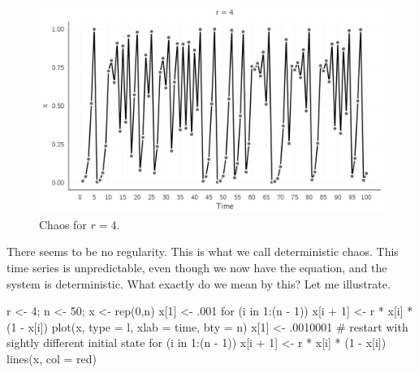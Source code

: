 \documentclass[
  a4paper,
  DIV=11,
  numbers=noendperiod]{scrreprt}
\newenvironment{Shaded}{\begin{snugshade}}{\end{snugshade}}
\newcommand{\AttributeTok}[1]{\textcolor[rgb]{0.40,0.45,0.13}{#1}}
\newcommand{\CommentTok}[1]{\textcolor[rgb]{0.37,0.37,0.37}{#1}}
\newcommand{\ControlFlowTok}[1]{\textcolor[rgb]{0.00,0.23,0.31}{#1}}
\newcommand{\DecValTok}[1]{\textcolor[rgb]{0.68,0.00,0.00}{#1}}
\newcommand{\FunctionTok}[1]{\textcolor[rgb]{0.28,0.35,0.67}{#1}}
\newcommand{\NormalTok}[1]{\textcolor[rgb]{0.00,0.23,0.31}{#1}}
\newcommand{\OtherTok}[1]{\textcolor[rgb]{0.00,0.23,0.31}{#1}}
\newcommand{\SpecialCharTok}[1]{\textcolor[rgb]{0.37,0.37,0.37}{#1}}
\newcommand{\StringTok}[1]{\textcolor[rgb]{0.13,0.47,0.30}{#1}}
\begin{document}
\begin{figure}

{\centering \includegraphics{media/ch2/fig-ch2-img5.jpg}

}

\caption{\label{fig-ch2-img5}Chaos for \(r = 4\).}

\end{figure}

There seems to be no regularity. This is what we call deterministic
chaos. This time series is unpredictable, even though we now have the
equation, and the system is deterministic. What exactly do we mean by
this? Let me illustrate.

\begin{Shaded}
\begin{Highlighting}[]
\NormalTok{r }\OtherTok{\textless{}{-}} \DecValTok{4}\NormalTok{;  n }\OtherTok{\textless{}{-}} \DecValTok{50}\NormalTok{; x }\OtherTok{\textless{}{-}} \FunctionTok{rep}\NormalTok{(}\DecValTok{0}\NormalTok{,n)}
\NormalTok{x[}\DecValTok{1}\NormalTok{] }\OtherTok{\textless{}{-}}\NormalTok{ .}\DecValTok{001}
\ControlFlowTok{for}\NormalTok{ (i }\ControlFlowTok{in} \DecValTok{1}\SpecialCharTok{:}\NormalTok{(n }\SpecialCharTok{{-}} \DecValTok{1}\NormalTok{))}
\NormalTok{  x[i }\SpecialCharTok{+} \DecValTok{1}\NormalTok{] }\OtherTok{\textless{}{-}}\NormalTok{ r }\SpecialCharTok{*}\NormalTok{ x[i] }\SpecialCharTok{*}\NormalTok{ (}\DecValTok{1} \SpecialCharTok{{-}}\NormalTok{ x[i])}
\FunctionTok{plot}\NormalTok{(x, }\AttributeTok{type =} \StringTok{\textquotesingle{}l\textquotesingle{}}\NormalTok{, }\AttributeTok{xlab =} \StringTok{\textquotesingle{}time\textquotesingle{}}\NormalTok{, }\AttributeTok{bty =} \StringTok{\textquotesingle{}n\textquotesingle{}}\NormalTok{)}
\NormalTok{x[}\DecValTok{1}\NormalTok{] }\OtherTok{\textless{}{-}}\NormalTok{ .}\DecValTok{0010001}
\CommentTok{\# restart with sightly different initial state}
\ControlFlowTok{for}\NormalTok{ (i }\ControlFlowTok{in} \DecValTok{1}\SpecialCharTok{:}\NormalTok{(n }\SpecialCharTok{{-}} \DecValTok{1}\NormalTok{))}
\NormalTok{  x[i }\SpecialCharTok{+} \DecValTok{1}\NormalTok{] }\OtherTok{\textless{}{-}}\NormalTok{ r }\SpecialCharTok{*}\NormalTok{ x[i] }\SpecialCharTok{*}\NormalTok{ (}\DecValTok{1} \SpecialCharTok{{-}}\NormalTok{ x[i])}
\FunctionTok{lines}\NormalTok{(x, }\AttributeTok{col =} \StringTok{\textquotesingle{}red\textquotesingle{}}\NormalTok{)}
\end{Highlighting}
\end{Shaded}
\end{document}
